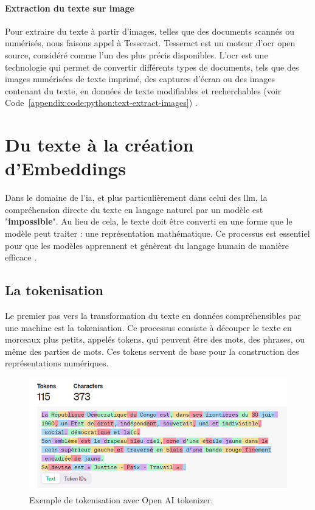 \paragraph{Extraction du texte sur image} \hspace{0pt}

Pour extraire du texte à partir d'images, telles que des documents scannés ou numérisés, nous faisons appel à Tesseract. Tesseract est un moteur d'\ac{ocr} open source, considéré comme l'un des plus précis disponibles. L'\ac{ocr} est une technologie qui permet de convertir différents types de documents, tels que des images numérisées de texte imprimé, des captures d'écran ou des images contenant du texte, en données de texte modifiables et recherchables (voir Code~\ref{appendix:code:python:text-extract-images}) \cite{smith_tesseract_2007}.


\section{Du texte à la création d'Embeddings}

Dans le domaine de l'\ac{ia}, et plus particulièrement dans celui des \ac{llm}, la compréhension directe du texte en langage naturel par un modèle est "\textbf{impossible}". Au lieu de cela, le texte doit être converti en une forme que le modèle peut traiter : une représentation mathématique. Ce processus est essentiel pour que les modèles apprennent et génèrent du langage humain de manière efficace \cite{Embeddings}.

\subsection{La tokenisation}
\label{ch:2:section:tokenization}

Le premier pas vers la transformation du texte en données compréhensibles par une machine est la tokenisation. Ce processus consiste à découper le texte en morceaux plus petits, appelés tokens, qui peuvent être des mots, des phrases, ou même des parties de mots. Ces tokens servent de base pour la construction des représentations numériques.

\begin{figure}[H]
    \centering
    \includegraphics[width=15cm]{gfx/fig-tokenization.png}
    
    \caption{Exemple de tokenisation avec Open AI tokenizer.}
    \label{fig:token}
\end{figure}

